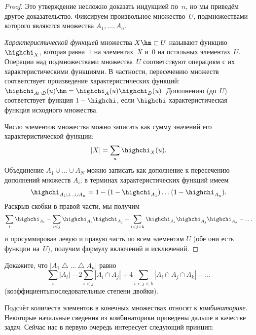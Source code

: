 \begin{proof}
Это утверждение несложно доказать индукцией по~$n$, но мы
приведём другое доказательство. Фиксируем произвольное
множество~$U$, подмножествами которого являются множества
$A_1, \dots, A_n$.

\emph{Характеристической функцией}
множества $X\hm\subset U$
называют функцию~$\highchi_X$, которая равна~$1$ на элементах~$X$
и~$0$ на остальных элементах~$U$. Операции над подмножествами
множества~$U$ соответствуют операциям с их характеристическими
функциями. В частности, пересечению множеств соответствует
произведение характеристических функций:
$\highchi_{A\cap B}(u)\hm=\highchi_{A}(u)\highchi_{B}(u)$. Дополнению (до~$U$)
соответствует функция $1-\highchi$, если $\highchi$\т
характеристическая функция исходного множества.

Число элементов множества можно записать как сумму значений его
характеристической функции:
        $$
|X|=\sum_{u} \highchi_{X}(u).
        $$
Объединение $A_1\cup\ldots\cup A_N$ можно записать как
дополнение к пересечению дополнений множеств $A_i$;
в терминах характеристических функций имеем
        $$
\highchi_{A_1\cup\ldots\cup A_n}=
1 - (1-\highchi_{A_1})\ldots (1-\highchi_{A_n}).
        $$
Раскрыв скобки в правой части, мы получим
        $$
\sum_{i}\highchi_{A_i}-\sum_{i<j}\highchi_{A_i}\highchi_{A_j}+
\sum_{i<j<k}\highchi_{A_i}\highchi_{A_j}\highchi_{A_k}-\ldots
        $$
и просуммировав левую и правую часть
по всем элементам $U$ (обе они есть функции на~$U$),
получим формулу включений и исключений.
\end{proof}

\begin{problem}
Докажите, что
   $|A_1\bigtriangleup\ldots\bigtriangleup A_n|$ равно
        $$
      \sum_{i}|A_i| - 2\sum_{i<j}|A_i \cap A_j| +
      4\sum_{i<j<k} |A_i \cap A_j \cap A_k| - \ldots
        $$
(коэффициенты\т последовательные степени двойки).
\end{problem}

Подсчёт количеств элементов в конечных множествах относят
к \emph{комбинаторике}. Некоторые начальные сведения из
комбинаторики приведены дальше в качестве задач. Сейчас
нас в первую очередь интересует следующий принцип:


